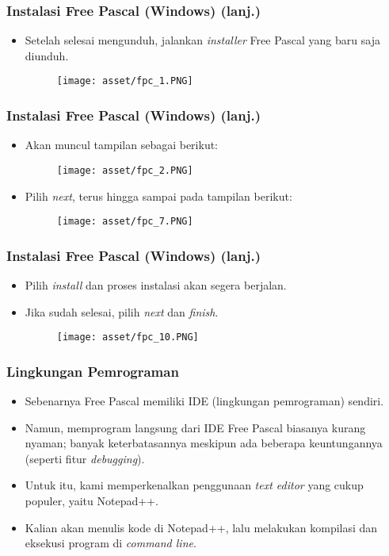 \begin{frame}
\frametitle{Instalasi Free Pascal (Windows) (lanj.)}
\begin{itemize}
  \item Setelah selesai mengunduh, jalankan \textit{installer} Free Pascal yang baru saja diunduh.
  \begin{figure}
    \texttt{[image: asset/fpc\_1.PNG]}
  \end{figure}
\end{itemize}
\end{frame}

\begin{frame}
\frametitle{Instalasi Free Pascal (Windows) (lanj.)}
\begin{itemize}
  \item Akan muncul tampilan sebagai berikut:
  \begin{figure}
    \texttt{[image: asset/fpc\_2.PNG]}
  \end{figure}
  \item Pilih \textit{next}, terus hingga sampai pada tampilan berikut:
  \begin{figure}
    \texttt{[image: asset/fpc\_7.PNG]}
  \end{figure}
\end{itemize}
\end{frame}

\begin{frame}
\frametitle{Instalasi Free Pascal (Windows) (lanj.)}
\begin{itemize}
  \item Pilih \textit{install} dan proses instalasi akan segera berjalan.
  \item Jika sudah selesai, pilih \textit{next} dan \textit{finish}.
  \begin{figure}
    \texttt{[image: asset/fpc\_10.PNG]}
  \end{figure}
\end{itemize}
\end{frame}

\begin{frame}
\frametitle{Lingkungan Pemrograman}
\begin{itemize}
  \item Sebenarnya Free Pascal memiliki IDE (lingkungan pemrograman) sendiri.
  \item Namun, memprogram langsung dari IDE Free Pascal biasanya kurang nyaman; banyak keterbatasannya meskipun ada beberapa keuntungannya (seperti fitur \textit{debugging}).
  \item Untuk itu, kami memperkenalkan penggunaan \textit{text editor} yang cukup populer, yaitu Notepad++.
  \item Kalian akan menulis kode di Notepad++, lalu melakukan kompilasi dan eksekusi program di \textit{command line}. 
\end{itemize}
\end{frame}

